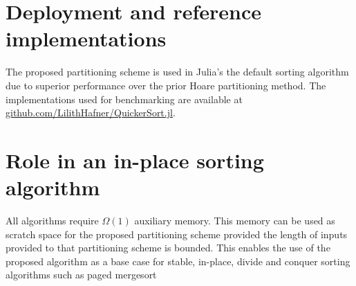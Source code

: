 \documentclass{juliacon}
\begin{document}
\section{Deployment and reference implementations}

The proposed partitioning scheme is used in Julia's the default sorting algorithm due to superior performance over the prior Hoare partitioning method\cite{PR}. The implementations used for benchmarking are available at \href{https://github.com/LilithHafner/QuickerSort.jl}{github.com/LilithHafner/QuickerSort.jl}.

\section{Role in an in-place sorting algorithm}

All algorithms require $\Omega(1)$ auxiliary memory. This memory can be used as scratch space for the proposed partitioning scheme provided the length of inputs provided to that partitioning scheme is bounded. This enables the use of the proposed algorithm as a base case for stable, in-place, divide and conquer sorting algorithms such as paged mergesort \cite{pagedmergesort}



\end{document}
